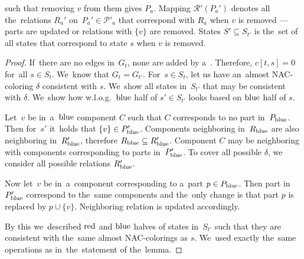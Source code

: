 such that removing \( v \) from them gives \( P_a \).
Mapping \( \mathcal{R'}(P_a') \) denotes all the~relations \( R_a' \)
on~\( P_a' \in \mathcal{P'}_a \) that correspond with \( R_a \) when \( v \) is removed
--- parts are updated or relations with \( \{v\} \) are removed.
States \( S' \subseteq S_{t'} \) is the~set of all states that
correspond to state \( s \) when \( v \) is removed.
%
\begin{proof}
	If~there are no edges in~\( G_t \), none are added by a~\ForgetVertexNode{}.
	Therefore, \( c[t, s] = 0 \) for~all \( s \in S_t \).
	We~know that \( G_t = G_{t'} \).
	For~\( s \in S_t \),
	let us have an~almost NAC-coloring \( \delta \) consistent with \( s \).
	We~show all states in~\( S_{t'} \) that may be consistent with \( \delta \).
	We~show how w.l.o.g.\ \( \text{blue} \) half of \( s' \in S_{t'} \) looks
	based on \( \text{blue} \) half of \( s \).

	Let~\( v \) be in~a~\( \text{blue} \) component \( C \) such that
	\( C \) corresponds to no part in~\( P_{\text{blue}} \).
	Then for~\( s' \) it~holds that \( \{v\} \in P_{\text{blue}}' \).
	Components neighboring in~\( R_{\text{blue}} \)
	are also neighboring in~\( R_{\text{blue}}' \), therefore \( R_{\text{blue}} \subseteq R_{\text{blue}}' \).
	Component \( C \) may be neighboring with
	components corresponding to parts in~\( P_{\text{blue}}' \).
	To cover all possible \( \delta \),
	we consider all possible relations \( R_{\text{blue}}' \).

	Now let~\( v \) be in~a~component corresponding to a~part \( p \in P_{\text{blue}} \).
	Then part in~\( P_{\text{blue}}' \) correspond to the~same components and the~only
	change is that part \( p \) is replaced by \( p \cup \{v\} \).
	Neighboring relation is updated accordingly.

	By this we~described \( \text{red} \) and \( \text{blue} \) halves of states in~\( S_{t'} \)
	such that they are consistent with the~same almost NAC-colorings as \( s \).
	We~used exactly the~same operations as in~the~statement of the~lemma.


\end{proof}
